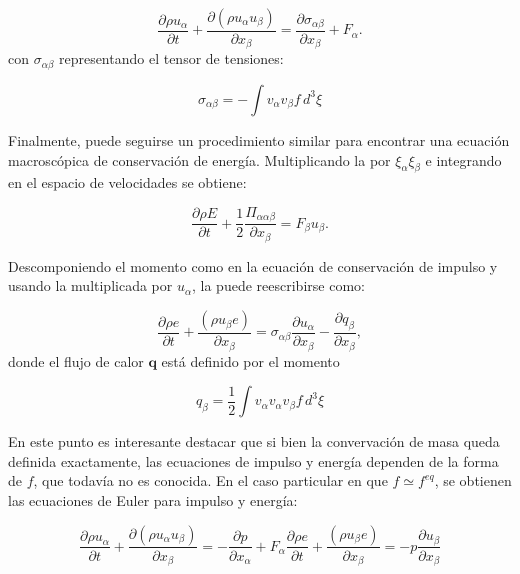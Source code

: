 \begin{equation}
	\dfrac{\partial \rho u_{\alpha}}{\partial t} 
	+ \dfrac{\partial (\rho u_{\alpha} u_{\beta})}{\partial x_{\beta}} = 
	\dfrac{\partial \sigma_{\alpha \beta}}{\partial x_{\beta}} + F_{\alpha}.
	\label{eq:impulso}
\end{equation}
con $\sigma_{\alpha \beta}$ representando el tensor de tensiones:

\begin{equation}
	\sigma_{\alpha \beta} = -\int v_{\alpha} v_{\beta} f \, d^3 \xi
\end{equation}

Finalmente, puede seguirse un procedimiento similar para encontrar una ecuaci\'on macrosc\'opica de conservaci\'on de energ\'ia. Multiplicando la  por $\xi_{\alpha} \xi_{\beta}$ e integrando en el espacio de velocidades se obtiene:

\begin{equation}
	\dfrac{\partial \rho E}{\partial t} + \dfrac{1}{2} \dfrac{\Pi_{\alpha\alpha\beta}}{\partial x_{\beta}} = F_{\beta} u_{\beta}.
	\label{eq:energy_flux}
\end{equation}

Descomponiendo el momento como en la ecuaci\'on de conservaci\'on de impulso y usando la  multiplicada por $u_{\alpha}$, la  puede reescribirse como:

\begin{equation}
	\dfrac{\partial \rho e}{\partial t} + \dfrac{(\rho u_{\beta} e)}{\partial x_{\beta}} = \sigma_{\alpha\beta} \dfrac{\partial u_{\alpha}}{\partial x_{\beta}} - \dfrac{\partial q_{\beta}}{\partial x_{\beta}},
\end{equation}
donde el flujo de calor $\bm{q}$ est\'a definido por el momento

\begin{equation}
	q_{\beta} = \dfrac{1}{2} \int v_{\alpha} v_{\alpha} v_{\beta} f \, d^3 \xi
\end{equation}


En este punto es interesante destacar que si bien la convervaci\'on de masa queda definida exactamente, las ecuaciones de impulso y energ\'ia dependen de la forma de $f$, que todav\'ia no es conocida. En el caso particular en que $f \simeq f^{eq}$, se obtienen las ecuaciones de Euler para impulso y energ\'ia:

\begin{subequations}
	\begin{equation}
	 	\dfrac{\partial \rho u_{\alpha}}{\partial t} 
	  + \dfrac{\partial (\rho u_{\alpha} u_{\beta})}{\partial x_{\beta}} 
	  =	-\dfrac{\partial p}{\partial x_{\alpha}} + F_{\alpha} 	
	\end{equation}
	\begin{equation}
		\dfrac{\partial \rho e}{\partial t} 
	  + \dfrac{(\rho u_{\beta} e)}{\partial x_{\beta}} 
	  = -p \dfrac{\partial u_{\beta}}{\partial x_{\beta}} 	
	\end{equation}
\end{subequations}

